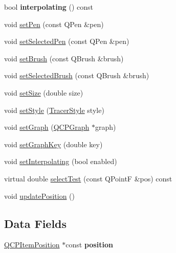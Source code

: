 \begin{DoxyCompactItemize}
\item 
\hypertarget{classQCPItemTracer_ab318c233fa35c17a317af38ce7b3c312}{bool {\bfseries interpolating} () const }\label{classQCPItemTracer_ab318c233fa35c17a317af38ce7b3c312}

\item 
void \hyperlink{classQCPItemTracer_af8048636fc1ef0152e51809b008df2ca}{set\-Pen} (const Q\-Pen \&pen)
\item 
void \hyperlink{classQCPItemTracer_ae1bf70db7f13f928660168cd3e5069f3}{set\-Selected\-Pen} (const Q\-Pen \&pen)
\item 
void \hyperlink{classQCPItemTracer_a2c303f7470a30084daa201ed556b3c36}{set\-Brush} (const Q\-Brush \&brush)
\item 
void \hyperlink{classQCPItemTracer_a0f55c084980a7a312af859d3e7b558ef}{set\-Selected\-Brush} (const Q\-Brush \&brush)
\item 
void \hyperlink{classQCPItemTracer_ae47fe0617f5fef5fdb766999569be10a}{set\-Size} (double size)
\item 
void \hyperlink{classQCPItemTracer_a41a2ac4f1acd7897b4e2a2579c03204e}{set\-Style} (\hyperlink{classQCPItemTracer_a2f05ddb13978036f902ca3ab47076500}{Tracer\-Style} style)
\item 
void \hyperlink{classQCPItemTracer_af5886f4ded8dd68cb4f3388f390790c0}{set\-Graph} (\hyperlink{classQCPGraph}{Q\-C\-P\-Graph} $\ast$graph)
\item 
void \hyperlink{classQCPItemTracer_a6840143b42f3b685cedf7c6d83a704c8}{set\-Graph\-Key} (double key)
\item 
void \hyperlink{classQCPItemTracer_a6c244a9d1175bef12b50afafd4f5fcd2}{set\-Interpolating} (bool enabled)
\item 
virtual double \hyperlink{classQCPItemTracer_a5a7297a98b14664e2dc16cba28e51192}{select\-Test} (const Q\-Point\-F \&pos) const 
\item 
void \hyperlink{classQCPItemTracer_a5b90296109e36384aedbc8908a670413}{update\-Position} ()
\end{DoxyCompactItemize}
\subsection*{Data Fields}
\begin{DoxyCompactItemize}
\item 
\hypertarget{classQCPItemTracer_a69917e2fdb2b3a929c196958feee7cbe}{\hyperlink{classQCPItemPosition}{Q\-C\-P\-Item\-Position} $\ast$const {\bfseries position}}\label{classQCPItemTracer_a69917e2fdb2b3a929c196958feee7cbe}

\end{DoxyCompactItemize}
